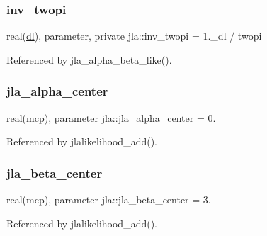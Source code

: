 \mbox{\label{namespacejla_a3f2ed7b8048c2f4dd93374020335944f}} 
\subsubsection{\texorpdfstring{inv\+\_\+twopi}{inv\_twopi}}
{\footnotesize\ttfamily real(\mbox{\hyperlink{namespacejla_a3aa6435b4e08f1d532390186ac608741}{dl}}), parameter, private jla\+::inv\+\_\+twopi = 1.\+\_\+dl / twopi\hspace{0.3cm}{\ttfamily [private]}}



Referenced by jla\+\_\+alpha\+\_\+beta\+\_\+like().

\mbox{\label{namespacejla_a4556268c3d45127055caae2fcea446fc}} 
\subsubsection{\texorpdfstring{jla\+\_\+alpha\+\_\+center}{jla\_alpha\_center}}
{\footnotesize\ttfamily real(mcp), parameter jla\+::jla\+\_\+alpha\+\_\+center = 0.}



Referenced by jlalikelihood\+\_\+add().

\mbox{\label{namespacejla_a9a9c2c6948ab744eed4e350dad8715bc}} 
\subsubsection{\texorpdfstring{jla\+\_\+beta\+\_\+center}{jla\_beta\_center}}
{\footnotesize\ttfamily real(mcp), parameter jla\+::jla\+\_\+beta\+\_\+center = 3.}



Referenced by jlalikelihood\+\_\+add().

\mbox{\label{namespacejla_a11ab12ec846d481127e505fb14a88ab3}} 
